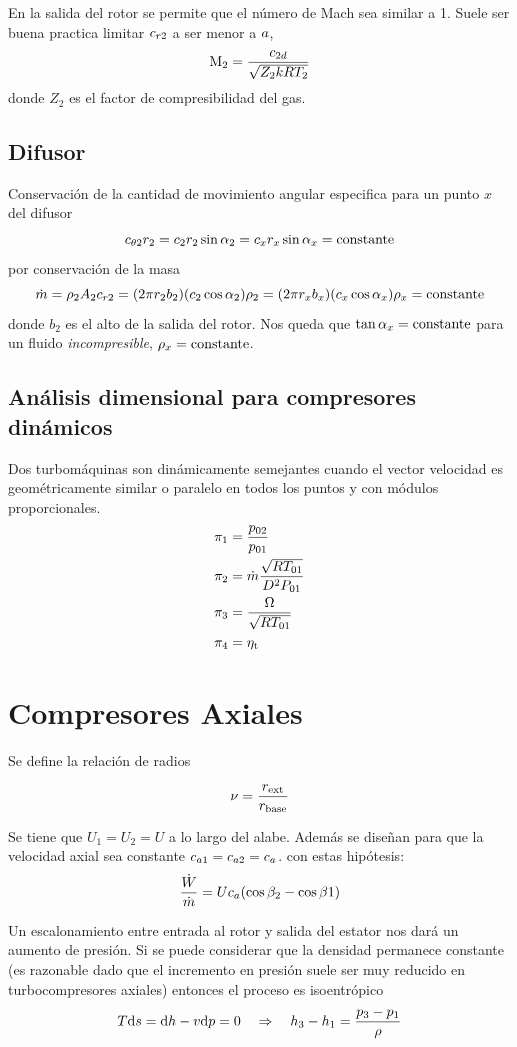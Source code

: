 \documentclass{article}
\begin{document}
En la salida del rotor se permite que el número de Mach sea similar a 1. Suele ser buena practica limitar $c_{r 2}$ a ser menor a $a$,
\[
\textrm{M}_2 = \frac{c_{2d}}{\sqrt{Z_2k R T_2}}
\]
donde $Z_2$ es el factor de compresibilidad del gas.


\subsection{Difusor}
\newcommand{\equis}{{\ensuremath{x}}}
Conservación de la cantidad de movimiento angular especifica para un punto \equis{} del difusor 
\[
\ctan{2} r_2 = c_2 r_2 \sin \alpha_2= c_\equis r_\equis \sin \alpha_\equis  = \cte
\]
por conservación de la masa
\[
\dm = \rho_2 A_2 \crad{2}  = (2\pi r_2 b_2 )(c_2 \cos \alpha_2) \rho_2 = (2\pi r_\equis b_\equis )(c_\equis \cos \alpha_\equis) \rho_\equis =\cte 
\]
donde $b_2$ es el alto de la salida del rotor. Nos  queda que $\tan \alpha_\equis=\cte$ para un fluido \textit{incompresible}, $\rho_\equis = \cte$.
\subsection{Análisis dimensional para compresores dinámicos}
Dos turbomáquinas son dinámicamente semejantes cuando el vector velocidad es geométricamente similar o paralelo en todos los puntos y con módulos proporcionales.
\begin{align}
    \pi_1 &= \frac{p_{02}}{p_{01}}\\
    \pi_2 &= \dot{m}\frac{\sqrt{R T_{01}}}{D^2 P_{01}}\\
    \pi_3 &= \frac{\Omega}{\sqrt{RT_{01}}}\\
    \pi_4 &= {\eta_{\mathrm{t}}}
\end{align}

\section{Compresores Axiales}
Se define la relación de radios

\[
\nu = \frac{{r_{\mathrm{ext}}}}{{r_{\mathrm{base}}}}
\]

Se tiene que $U_1=U_2=U$ a lo largo del alabe. Además se diseñan para que la velocidad axial sea constante $c_{a 1}=c_{a 2}=c_{a }$. con estas hipótesis:
\[
\frac{\dot{W}}{\dot{m}}=U c_{a } (\cos \beta_2 - \cos \beta 1 )
\]

Un escalonamiento entre entrada al rotor y salida del estator nos dará un aumento de presión. Si se puede considerar que la densidad permanece constante (es razonable dado que el incremento en presión suele ser muy reducido en turbocompresores axiales) entonces el proceso es isoentrópico
\[
T\textrm{d} s = \textrm{d} h - v \textrm{d} p =0\quad \Rightarrow \quad h_3 - h_1 = \frac{p_3-p_1}{\rho}
\]
\end{document}
